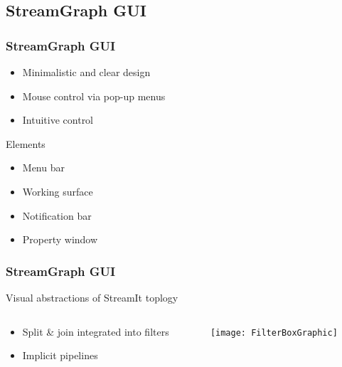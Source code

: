 \documentclass{beamer}
\begin{document}
\subsection{StreamGraph GUI}
\begin{frame}
\frametitle{StreamGraph GUI}
	\begin{itemize}
		\item Minimalistic and clear design
		\item Mouse control via pop-up menus
		\item Intuitive control
	\end{itemize}
	\begin{block}{Elements}
		\begin{itemize}
			\item Menu bar
			\item Working surface
			\item Notification bar
			\item Property window
		\end{itemize}
	\end{block}
\end{frame}

\begin{frame}
\frametitle{StreamGraph GUI}
	Visual abstractions of StreamIt toplogy
	\begin{columns}[c]
		\begin{column}{0.48\textwidth}
			\begin{itemize}	
				\item Split \& join integrated into filters
				\item Implicit pipelines
			\end{itemize}
		\end{column}
		\hfill
		\begin{column}{0.48\textwidth}
			\texttt{[image: FilterBoxGraphic]}
			\label{fig_filterAbstraction}		
		\end{column}
	\end{columns}		
\end{frame}


\end{document}

